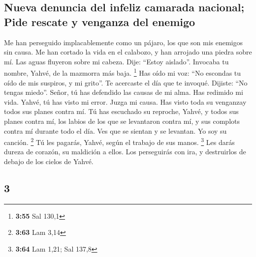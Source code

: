 \begin{paracol}{2}
\hypertarget{nueva-denuncia-del-infeliz-camarada-nacional-pide-rescate-y-venganza-del-enemigo}{%
\subsection{Nueva denuncia del infeliz camarada nacional; Pide rescate y
venganza del
enemigo}\label{nueva-denuncia-del-infeliz-camarada-nacional-pide-rescate-y-venganza-del-enemigo}}

 Me han perseguido implacablemente como un pájaro, los
que son mis enemigos sin causa.  Me han cortado la vida
en el calabozo, y han arrojado una piedra sobre mí.  Las
aguas fluyeron sobre mi cabeza. Dije: ``Estoy aislado''. 
Invocaba tu nombre, Yahvé, de la mazmorra más baja. \footnote{\textbf{3:55}
  Sal 130,1}  Has oído mi voz: ``No escondas tu oído de
mis suspiros, y mi grito''.  Te acercaste el día que te
invoqué. Dijiste: ``No tengas miedo''.  Señor, tú has
defendido las causas de mi alma. Has redimido mi vida. 
Yahvé, tú has visto mi error. Juzga mi causa.  Has visto
toda su venganzay todos sus planes contra mí.  Tú has
escuchado su reproche, Yahvé, y todos sus planes contra mí,
 los labios de los que se levantaron contra mí, y sus
complots contra mí durante todo el día.  Ves que se
sientan y se levantan. Yo soy su canción. \footnote{\textbf{3:63} Lam
  3,14}  Tú les pagarás, Yahvé, según el trabajo de sus
manos. \footnote{\textbf{3:64} Lam 1,21; Sal 137,8}  Les
darás dureza de corazón, su maldición a ellos.  Los
perseguirás con ira, y destruirlos de debajo de los cielos de Yahvé.

\switchcolumn
\begin{otherlanguage}{english}

\hypertarget{section-5}{%
\section{3}\label{section-5}}


\end{otherlanguage}
\end{paracol}
